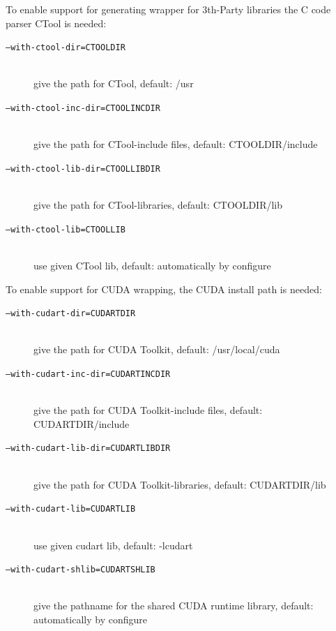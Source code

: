 \documentclass[a4paper,twoside,12pt,BCOR12mm]{scrbook}
\begin{document}
\begin{latexonly}
\begin{description}
\end{description}

\noindent To enable support for generating wrapper for 3th-Party libraries the C code parser CTool is needed:

\begin{description}
\item[\texttt{--with-ctool-dir=CTOOLDIR}] ~\\
                              give the path for CTool, default: /usr

\item[\texttt{--with-ctool-inc-dir=CTOOLINCDIR}] ~\\
                              give the path for CTool-include files, default:
                              CTOOLDIR/include

\item[\texttt{--with-ctool-lib-dir=CTOOLLIBDIR}] ~\\
                              give the path for CTool-libraries, default:
                              CTOOLDIR/lib

\item[\texttt{--with-ctool-lib=CTOOLLIB}] ~\\
                              use given CTool lib, default: automatically by configure

\end{description}

\noindent To enable support for CUDA wrapping, the CUDA install path is needed:

\begin{description}

\item[\texttt{--with-cudart-dir=CUDARTDIR}] ~\\
                          give the path for CUDA Toolkit, default: /usr/local/cuda
\item[\texttt{--with-cudart-inc-dir=CUDARTINCDIR}] ~\\
                          give the path for CUDA Toolkit-include files, default:                                          
                          CUDARTDIR/include                                                                         
\item[\texttt{--with-cudart-lib-dir=CUDARTLIBDIR}] ~\\
                          give the path for CUDA Toolkit-libraries, default:                                              
                          CUDARTDIR/lib                                                                             
\item[\texttt{--with-cudart-lib=CUDARTLIB}] ~\\
                          use given cudart lib, default: -lcudart
\item[\texttt{--with-cudart-shlib=CUDARTSHLIB}] ~\\
			  give the pathname for the shared CUDA runtime library, default:
			  automatically by configure


\end{description}
\end{latexonly}
\end{document}
